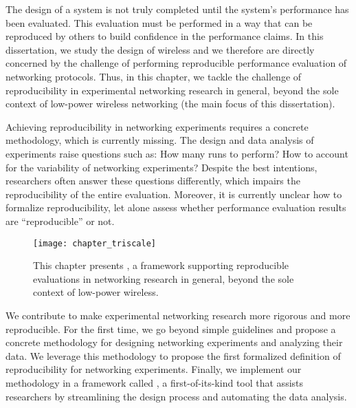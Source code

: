 
The design of a system is not truly completed until the system's performance has been evaluated. This evaluation must be performed in a way that can be reproduced by others to build confidence in the performance claims.
In this dissertation, we study the design of wireless \CPS and we therefore are directly concerned by the challenge of performing reproducible performance evaluation of networking protocols.
Thus, in this chapter, we tackle the challenge of reproducibility in experimental networking research in general, beyond the sole context of low-power wireless networking (the main focus of this dissertation).


Achieving reproducibility in networking experiments requires a concrete methodology, which is currently missing.
The design and data analysis of experiments raise questions such as: How many runs to perform? How to account for the variability of networking experiments?
Despite the best intentions, researchers often answer these questions differently, which impairs the reproducibility of the entire evaluation.
Moreover, it is currently unclear how to formalize reproducibility, let alone assess whether performance evaluation results are ``reproducible'' or not.


\begin{figure}
  \centering
  \texttt{[image: chapter\_triscale]}
  \caption{This chapter presents \triscale, a framework supporting reproducible evaluations in networking research in general, beyond the sole context of low-power wireless.}
  \label{fig:chapter_triscale}
\end{figure}

We contribute to make experimental networking research more rigorous and more reproducible.
For the first time, we go beyond simple guidelines and propose a concrete methodology for designing networking experiments and analyzing their data.
We leverage this methodology to propose the first formalized definition of reproducibility for networking experiments.
Finally, we implement our methodology in a framework called \triscale, a first-of-its-kind tool that assists researchers by streamlining the design process and automating the data analysis.

